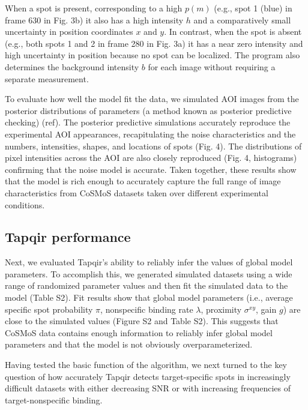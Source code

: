 When a spot is present, corresponding to a high $p(m)$ (e.g., spot 1 (blue) in frame 630 in Fig. 3b) it also has a high intensity $h$ and a comparatively small uncertainty in position coordinates $x$ and $y$. In contrast, when the spot is absent (e.g., both spots 1 and 2 in frame 280 in Fig. 3a) it has a near zero intensity and high uncertainty in position because no spot can be localized. The program also determines the background intensity $b$ for each image without requiring a separate measurement. 


To evaluate how well the model fit the data, we simulated AOI images from the posterior distributions of parameters (a method known as posterior predictive checking) (ref). The posterior predictive simulations accurately reproduce the experimental AOI appearances, recapitulating the noise characteristics and the numbers, intensities, shapes, and locations of spots (Fig. 4).  The distributions of pixel intensities across the AOI are also closely reproduced (Fig. 4, histograms) confirming that the noise model is accurate. Taken together, these results show that the model is rich enough to accurately capture the full range of image characteristics from CoSMoS datasets taken over different experimental conditions.

\subsection*{Tapqir performance}

Next, we evaluated Tapqir's ability to reliably infer the values of global model parameters. To  accomplish this, we generated simulated datasets  using  a wide range of randomized parameter values and then fit the simulated data to the model (Table S2). Fit results show that global model parameters (i.e., average specific spot probability $\pi$, nonspecific binding rate $\lambda$, proximity $\sigma^{xy}$, gain $g$) are close to the simulated values  (Figure S2 and Table S2). This suggests that CoSMoS data contains enough information to reliably infer global model parameters and that the model is not obviously overparameterized.

Having tested the basic function of the algorithm, we next turned to the key question of how accurately Tapqir detects target-specific spots in increasingly difficult datasets with either decreasing SNR or with increasing frequencies of target-nonspecific binding.  

